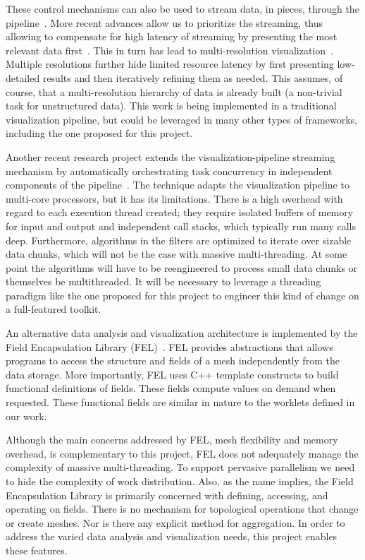 \documentclass{vgtc}                          %
\newcommand*{\lcite}[1]{~\cite{#1}}
\begin{document}
These control mechanisms can also be used to stream data, in pieces,
through the pipeline\lcite{Ahrens01}.  More recent advances allow us to
prioritize the streaming, thus allowing to compensate for high latency of
streaming by presenting the most relevant data first\lcite{Ahrens07}.  This
in turn has lead to multi-resolution
visualization\lcite{Pascucci01,Woodring09}.  Multiple resolutions further
hide limited resource latency by first presenting low-detailed results and
then iteratively refining them as needed.  This assumes, of course, that a
multi-resolution hierarchy of data is already built (a non-trivial task for
unstructured data).  This work is being implemented in a traditional
visualization pipeline, but could be leveraged in many other types of
frameworks, including the one proposed for this project.

Another recent research project extends the visualization-pipeline
streaming mechanism by automatically orchestrating task concurrency in
independent components of the pipeline\lcite{Vo09}.  The technique adapts
the visualization pipeline to multi-core processors, but it has its
limitations.  There is a high overhead with regard to each execution thread
created; they require isolated buffers of memory for input and output and
independent call stacks, which typically run many calls deep.  Furthermore,
algorithms in the filters are optimized to iterate over sizable data
chunks, which will not be the case with massive multi-threading.  At some
point the algorithms will have to be reengineered to process small data
chunks or themselves be multithreaded.  It will be necessary to leverage a
threading paradigm like the one proposed for this project to engineer this
kind of change on a full-featured toolkit.

An alternative data analysis and visualization architecture is implemented
by the Field Encapsulation Library (FEL)\lcite{FELPaper}.  FEL provides
abstractions that allows programs to access the structure and fields of a
mesh independently from the data storage.  More importantly, FEL uses C++
template constructs to build functional definitions of fields.  These
fields compute values on demand when requested.  These functional fields
are similar in nature to the worklets defined in our work.

Although the main concerns addressed by FEL, mesh flexibility and memory
overhead, is complementary to this project, FEL does not adequately manage
the complexity of massive multi-threading.  To support pervasive parallelism
we need to hide the complexity of work distribution.  Also, as the name
implies, the Field Encapsulation Library is primarily concerned with
defining, accessing, and operating on fields.  There is no mechanism for
topological operations that change or create meshes.  Nor is there any
explicit method for aggregation.  In order to address the varied data
analysis and visualization needs, this project enables these features.
\end{document}
